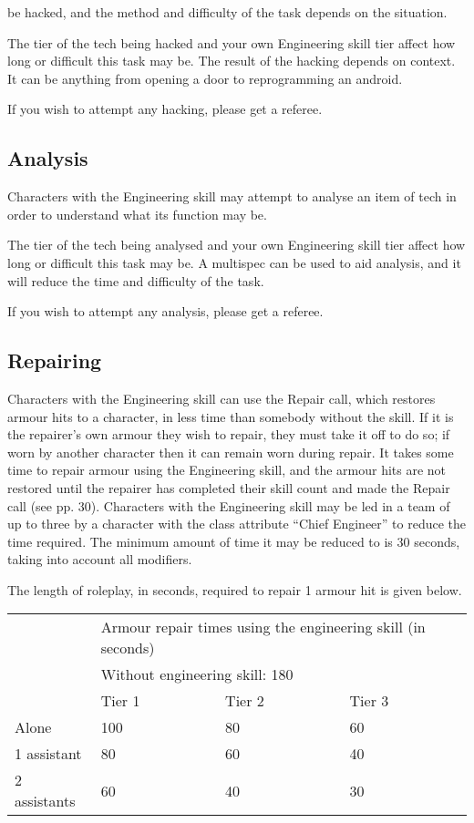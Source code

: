 \documentclass{scrbook}
\begin{document}
be hacked, and the method and difficulty of the task depends on the situation.

The tier of the tech being hacked and your own Engineering skill tier affect how long or difficult this task may be. The result of the hacking depends on context. It can be anything from opening a door to reprogramming an android.

If you wish to attempt any hacking, please get a referee.

\subsection{Analysis}

Characters with the Engineering skill may attempt to analyse an item of tech in order to understand what its function may be.

The tier of the tech being analysed and your own Engineering skill tier affect how long or difficult this task may be. A multispec can be used to aid analysis, and it will reduce the time and difficulty of the task.

If you wish to attempt any analysis, please get a referee.

\subsection{Repairing}

Characters with the Engineering skill can use the Repair call, which restores armour hits to a character, in less time than somebody without the skill. If it is the repairer's own armour they wish to repair, they must take it off to do so; if worn by another character then it can remain worn during repair. It takes some time to repair armour using the Engineering skill, and the armour hits are not restored until the repairer has completed their skill count and made the Repair call (see pp. 30). Characters with the Engineering skill may be led in a team of up to three by a character with the class attribute ``Chief Engineer'' to reduce the time required. The minimum amount of time it may be reduced to is 30 seconds, taking into account all modifiers.

The length of roleplay, in seconds, required to repair 1 armour hit is given below.

\begin{table}
\begin{tabular}{|l|l|l|l|} \hline 
\multirow{2}{*}{}& \multicolumn{3}{|l|}{Armour repair times using the engineering skill (in seconds)} \\
\cline{2-2}\cline{3-3}\cline{4-4} & \multicolumn{3}{|l|}{Without engineering skill: 180} \\
\cline{2-2}\cline{3-3}\cline{4-4} & Tier 1 & Tier 2 & Tier 3 \\
 \hline Alone & 100 & 80 & 60 \\
 \hline 1 assistant & 80 & 60 & 40 \\
 \hline 2 assistants & 60 & 40 & 30 \\
 \hline \end{tabular}

\end{table}
\end{document}
